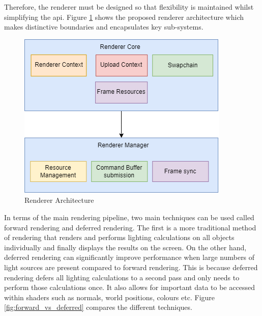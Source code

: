 \documentclass[11pt]{article}
\begin{document}
Therefore, the renderer must be designed so that flexibility is maintained
whilst simplifying the \gls*{api}. Figure \ref{fig:rendererarch} shows the
proposed renderer architecture which makes distinctive boundaries and
encapsulates key sub-systems.

\begin{figure}[H]
  \centering
  \includegraphics[width=\textwidth]{images/renderer_architecture.png}
  \caption{Renderer Architecture}
  \label{fig:rendererarch}
\end{figure}


In terms of the main rendering pipeline, two main techniques can be used called
forward rendering and deferred rendering. The first is a more traditional method
of rendering that renders and performs lighting calculations on all objects
individually and finally displays the results on the screen. On the other hand,
deferred rendering can significantly improve performance when large numbers of
light sources are present compared to forward rendering. This is because
deferred rendering defers all lighting calculations to a second pass and only
needs to perform those calculations once. It also allows for important data to
be accessed within shaders such as normals, world positions, colours etc. 
Figure \ref{fig:forward_vs_deferred} compares the different techniques.
\end{document}
